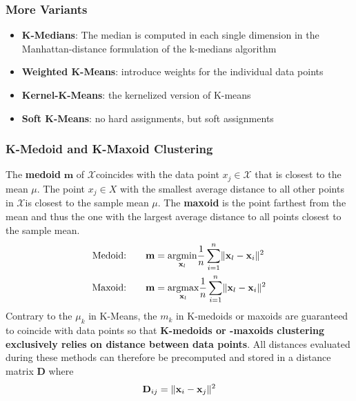\documentclass[11pt]{article}
\theoremstyle{definition}
\newcommand*\X{\ensuremath{\mathcal{X}}}
\newcommand*\argmax[1]{\underset{#1}{\text{argmax}}}
\newcommand*\argmin[1]{\underset{#1}{\text{argmin}}}
\DeclarePairedDelimiter\norm{\lVert}{\rVert}
\begin{document}
\subsubsection{More Variants}
\begin{itemize}
	\item \textbf{K-Medians}: The median is computed in each single dimension in the Manhattan-distance formulation of the k-medians algorithm
	\item \textbf{Weighted K-Means}: introduce weights for the individual data points
	\item \textbf{Kernel-K-Means}: the kernelized version of K-means
	\item \textbf{Soft K-Means}: no hard assignments, but soft assignments
\end{itemize}

\subsubsection{K-Medoid and K-Maxoid Clustering}
The \textbf{medoid} $\textbf{m}$ of \X coincides with the data point $x_j \in \X$ that is closest to the mean $\mu$. The point $x_j \in X$ with the smallest average distance to all other points in \X is closest to the sample mean $\mu$. The \textbf{maxoid} is the point farthest from the mean and thus the one with the largest average distance to all points closest to the sample mean.
\begin{align*}
	\text{Medoid:}\qquad \textbf{m} &= \argmin{\textbf{x}_l} \frac{1}{n} \sum_{i=1}^{n}\norm{\textbf{x}_l - \textbf{x}_i}^2\\
	\text{Maxoid:}\qquad \textbf{m} &= \argmax{\textbf{x}_l} \frac{1}{n} \sum_{i=1}^{n}\norm{\textbf{x}_l - \textbf{x}_i}^2
\end{align*}
Contrary to the $\mu_k$ in K-Means, the $m_k$ in K-medoids or maxoids are guaranteed to coincide with data points so that \textbf{K-medoids or -maxoids clustering exclusively relies on distance between data points}. All distances evaluated during these methods can therefore be precomputed and stored in a distance matrix $\textbf{D}$ where
\begin{equation*}
	\textbf{D}_{ij} = \norm{\textbf{x}_i - \textbf{x}_j}^2
\end{equation*}
\end{document}
